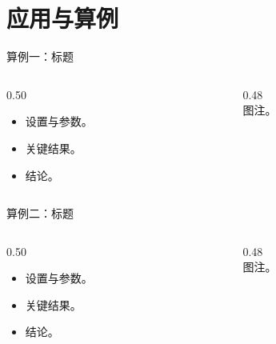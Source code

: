 \documentclass[10pt,aspectratio=169]{ctexbeamer}
\begin{document}
\section{应用与算例}

\begin{frame}{算例一：标题}          %
  \begin{columns}[T]
    \begin{column}{0.50\textwidth}
      \begin{itemize}
        \item 设置与参数。
        \item 关键结果。
        \item 结论。
      \end{itemize}
    \end{column}
    \begin{column}{0.48\textwidth}
      \centering
      \\
      {\footnotesize 图注。}
    \end{column}
  \end{columns}
\end{frame}

\begin{frame}{算例二：标题}          %
  \begin{columns}[T]
    \begin{column}{0.50\textwidth}
      \begin{itemize}
        \item 设置与参数。
        \item 关键结果。
        \item 结论。
      \end{itemize}
    \end{column}
    \begin{column}{0.48\textwidth}
      \centering
      \\
      {\footnotesize 图注。}
    \end{column}
  \end{columns}
\end{frame}

\end{document}
